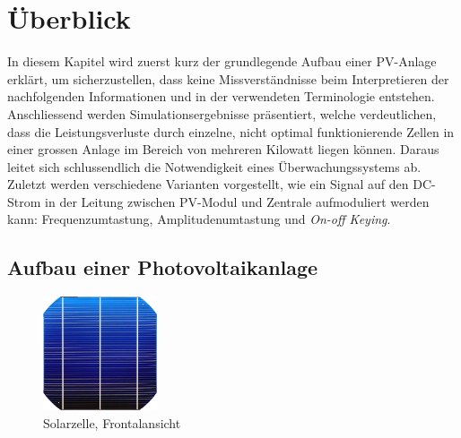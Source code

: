 \chapter{\"Uberblick}
\label{chap:uberblick}

In   diesem  Kapitel   wird  zuerst   kurz  der   grundlegende  Aufbau   einer
PV-Anlage  erkl\"art,  um   sicherzustellen,  dass  keine  Missverst\"andnisse
beim   Interpretieren    der   nachfolgenden   Informationen   und    in   der
verwendeten Terminologie entstehen. Anschliessend werden Simulationsergebnisse
pr\"asentiert,   welche  verdeutlichen,   dass  die   Leistungsverluste  durch
einzelne,  nicht  optimal  funktionierende  Zellen  in  einer  grossen  Anlage
im  Bereich   von  mehreren  Kilowatt  liegen   k\"onnen. Daraus  leitet  sich
schlussendlich  die  Notwendigkeit   eines  \"Uberwachungssystems  ab. Zuletzt
werden verschiedene  Varianten vorgestellt,  wie ein  Signal auf  den DC-Strom
in   der  Leitung   zwischen   PV-Modul  und   Zentrale  aufmoduliert   werden
kann: Frequenzumtastung, Amplitudenumtastung  und \emph{On-off Keying}.


\section{Aufbau einer Photovoltaikanlage}
\label{sec:solaranlage:aufbau}

\enlargethispage{1em}
\begin{figure}
    \centering
    \includegraphics[width=0.30\textwidth]{images/solar-facility/cell--400px.png}
    \caption[Bild einer PV-Zelle]
    {Solarzelle, Frontalansicht \cite{ref:pvcell:wikipedia}}
    \label{fig:pvcell:front}
    \vspace*{-1em}
\end{figure}

